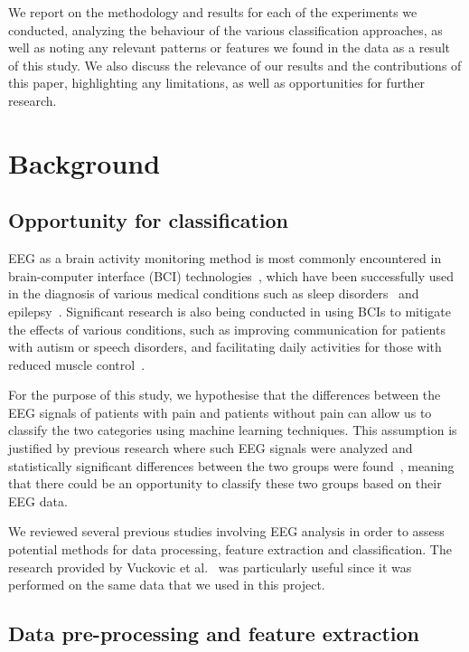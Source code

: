 \documentclass{mpaper}
\begin{document}
We report on the methodology and results for each of the experiments we conducted, analyzing the behaviour of the various classification approaches, as well as noting any relevant patterns or features we found in the data as a result of this study. We also discuss the relevance of our results and the contributions of this paper, highlighting any limitations, as well as opportunities for further research.

\section{Background}

\subsection{Opportunity for classification}

EEG as a brain activity monitoring method is most commonly encountered in brain-computer interface (BCI) technologies~\cite{wolpaw_brain-computer_2000}, which have been successfully used in the diagnosis of various medical conditions such as sleep disorders~\cite{min_medical_2009} and epilepsy~\cite{acharya_automated_2013}. Significant research is also being conducted in using BCIs to mitigate the effects of various conditions, such as improving communication for patients with autism or speech disorders, and facilitating daily activities for those with reduced muscle control~\cite{wolpaw_brain-computer_2000}.

For the purpose of this study, we hypothesise that the differences between the EEG signals of patients with pain and patients without pain can allow us to classify the two categories using machine learning techniques. This assumption is justified by previous research where such EEG signals were analyzed and statistically significant differences between the two groups were found~\cite{vuckovic_dynamic_2014,jarjees_causality_2017}, meaning that there could be an opportunity to classify these two groups based on their EEG data.

We reviewed several previous studies involving EEG analysis in order to assess potential methods for data processing, feature extraction and classification. The research provided by Vuckovic et al.~\cite{vuckovic_dynamic_2014} was particularly useful since it was performed on the same data that we used in this project.

\subsection{Data pre-processing and feature extraction}
\end{document}
